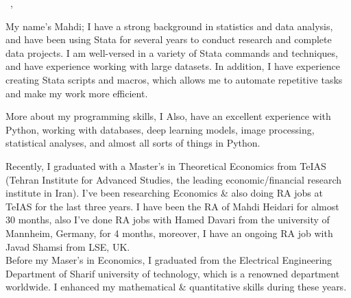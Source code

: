 \documentclass[12pt]{letter}
\begin{document}
\AddToShipoutPictureBG{%
    \color{gr}
    \AtPageUpperLeft{\rule[-1.3in]{\paperwidth}{1.3in}}
}

\begin{center}
    {\fontsize{28}{0}\selectfont\scshape \myname}

    \href{mailto:\myemail}{\faEnvelope\enspace \myemail}\hfill
    \href{tel:\myphone}{\faPhone\enspace \myphone}\hfill
    \faMapMarker \enspace \mylocation
\end{center}

\vspace{0.3in}



\vspace{-0.1in}

\greeting\
\recipient,\\

\vspace{-0.1in}\setlength\parindent{24pt}

My name's Mahdi; I have a strong background in statistics and data analysis,
and have been using Stata for several years to conduct research and complete
data projects. I am well-versed in a variety of Stata commands and techniques,
and have experience working with large datasets. In addition, I have experience creating Stata scripts and macros,
which allows me to automate repetitive tasks and make my work more efficient.

\par

More about my programming skills, I Also, have an excellent experience with Python,
working with databases, deep learning models, image processing, statistical
analyses, and almost all sorts of things in Python.

\par

Recently, I graduated with a Master's in Theoretical Economics from TeIAS (Tehran
Institute for Advanced Studies, the leading economic/financial research institute
in Iran). I've been researching Economics \&
also doing RA jobs at TeIAS for the last three years. I have been the RA of Mahdi Heidari for almost 30 months, also I've done RA jobs
with Hamed Davari from the university of Mannheim, Germany, for 4 months, moreover, I have an ongoing RA job with Javad Shamsi from LSE, UK.
\\
Before my Maser's in Economics, I graduated from the Electrical Engineering Department
of Sharif university of technology, which is a renowned department worldwide.
I enhanced my mathematical \& quantitative skills during these years.
\end{document}
